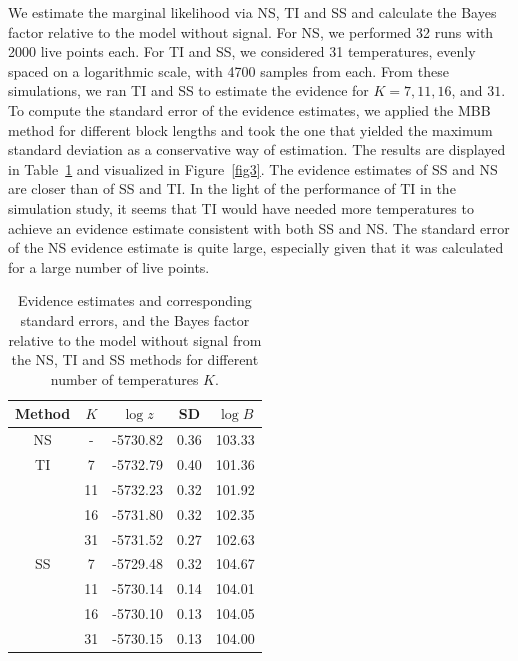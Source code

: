 \documentclass[aps,reprint,amsmath,amssymb,showpacs,showkeys]{revtex4-1}%
\newcommand{\cb}{ \color{blue}}
\begin{document}
We estimate the marginal likelihood via NS, TI and SS and calculate the Bayes factor relative to the model without signal.  For NS, we performed 32
runs with 2000 live points each. For TI and SS, we considered 31 temperatures, evenly spaced on a logarithmic scale, with 4700 samples from each.  From these simulations, we ran TI and SS to estimate the evidence for $K=7, 11, 16$, and $31$.  To compute the standard error of the evidence estimates, we applied the MBB method for different block lengths and took the one that yielded the maximum standard
deviation  as a conservative way of estimation. The results are displayed in Table~\ref{tab:results} and visualized in Figure~\ref{fig3}.
The evidence estimates of SS and NS are closer than of SS and TI. In the light of the performance of  TI in the simulation study, it seems that TI would have
needed more temperatures to achieve an evidence estimate consistent with both SS and NS. The standard error of the NS evidence estimate is quite large, especially
given that it was calculated for a large number of live points.  %

\begin{table}
	\caption{\label{tab:results} Evidence estimates and corresponding standard errors, and the Bayes factor relative to the model without signal from the NS, TI and SS methods for different number of temperatures $K$.}
	\begin{ruledtabular}
		\begin{tabular}{ccccc}
			Method & $K$ & $\log z$ & SD& $\log B$  \\ \hline
			NS & - &-5730.82 & 0.36  & 103.33    \\ \hline
			TI   & 7 &-5732.79 &  0.40 & 101.36     \\
			      & 11 &-5732.23 & 0.32 &101.92\\
			      & 16 &-5731.80 & 0.32 &102.35\\
			      & 31 &-5731.52 & 0.27 &102.63\\ \hline
			SS & 7   &-5729.48 & 0.32 & 104.67  \\
			      & 11  &-5730.14 & 0.14 &104.01\\
			      & 16 &-5730.10 & 0.13 &104.05\\
			      & 31 &-5730.15 & 0.13 &104.00\\
		\end{tabular}
	\end{ruledtabular}
\end{table}
\end{document}

